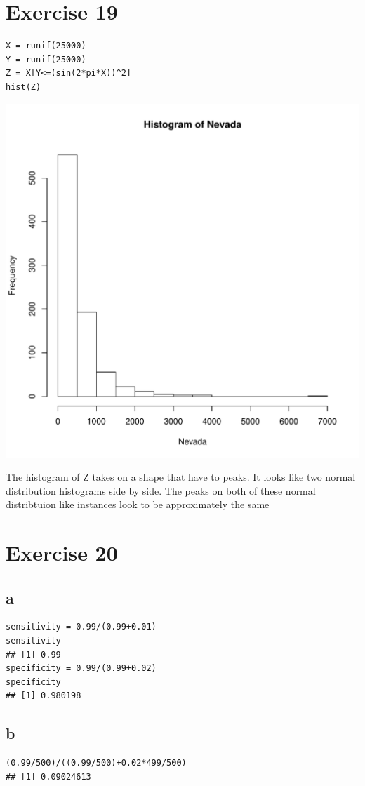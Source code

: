 \documentclass{article}\usepackage[]{graphicx}\usepackage[]{color}
\makeatletter
\newenvironment{kframe}{%
 \def\at@end@of@kframe{}%
 \ifinner\ifhmode%
  \def\at@end@of@kframe{\end{minipage}}%
  \begin{minipage}{\columnwidth}%
 \fi\fi%
 \def\FrameCommand##1{\hskip\@totalleftmargin \hskip-\fboxsep
 \colorbox{shadecolor}{##1}\hskip-\fboxsep
     \hskip-\linewidth \hskip-\@totalleftmargin \hskip\columnwidth}%
 \MakeFramed {\advance\hsize-\width
   \@totalleftmargin\z@ \linewidth\hsize
   \@setminipage}}%
 {\par\unskip\endMakeFramed%
 \at@end@of@kframe}
\newenvironment{knitrout}{}{} %
\makeatother
\begin{document}
\section*{Exercise 19}
\begin{knitrout}
\color{fgcolor}\begin{kframe}
\begin{verbatim}
X = runif(25000)
Y = runif(25000)
Z = X[Y<=(sin(2*pi*X))^2]
hist(Z)
\end{verbatim}
\end{kframe}
\includegraphics[width=0.33\linewidth]{figure/unnamed-chunk-4-1} 

\end{knitrout}
The histogram of Z takes on a shape that have to peaks. It looks like two normal distribution histograms side by side. The peaks on both of these normal distribtuion like instances look to be approximately the same
\section*{Exercise 20}
\subsection*{a}
\begin{knitrout}
\color{fgcolor}\begin{kframe}
\begin{verbatim}
sensitivity = 0.99/(0.99+0.01)
sensitivity
## [1] 0.99
specificity = 0.99/(0.99+0.02)
specificity
## [1] 0.980198
\end{verbatim}
\end{kframe}
\end{knitrout}
\subsection*{b}

\begin{knitrout}
\color{fgcolor}\begin{kframe}
\begin{verbatim}
(0.99/500)/((0.99/500)+0.02*499/500)
## [1] 0.09024613
\end{verbatim}
\end{kframe}
\end{knitrout}
\end{document}
